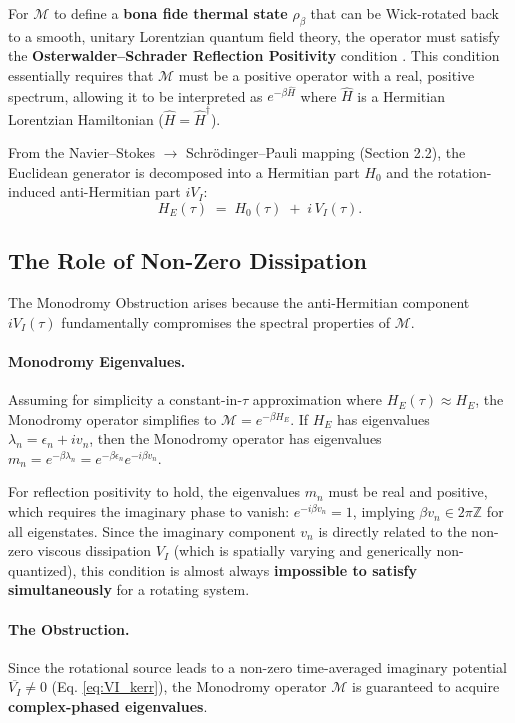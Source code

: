 \documentclass[11pt]{article}
\begin{document}
For $\mathcal{M}$ to define a \textbf{bona fide thermal state} $\rho_\beta$ that can be Wick-rotated back to a smooth, unitary Lorentzian quantum field theory, the operator must satisfy the \textbf{Osterwalder--Schrader Reflection Positivity\cite{OsterwalderSchrader1973}} condition \cite{OsterwalderSchrader1973}. This condition essentially requires that $\mathcal{M}$ must be a positive operator with a real, positive spectrum, allowing it to be interpreted as $e^{-\beta \widehat{H}}$ where $\widehat{H}$ is a Hermitian Lorentzian Hamiltonian ($\widehat{H} = \widehat{H}^\dagger$).

From the Navier--Stokes $\to$ Schrödinger--Pauli mapping (Section 2.2), the Euclidean generator is decomposed into a Hermitian part $H_0$ and the rotation-induced anti-Hermitian part $iV_I$:
\begin{equation}\label{eq:HE_decomp}
    H_E(\tau) \;=\; H_0(\tau) \;+\; i\,V_I(\tau).
\end{equation}

\subsection{The Role of Non-Zero Dissipation}

The Monodromy Obstruction arises because the anti-Hermitian component $iV_I(\tau)$ fundamentally compromises the spectral properties of $\mathcal{M}$.

\paragraph{Monodromy Eigenvalues.}
Assuming for simplicity a constant-in-$\tau$ approximation where $H_E(\tau) \approx H_E$, the Monodromy operator simplifies to $\mathcal{M} = e^{-\beta H_E}$. If $H_E$ has eigenvalues $\lambda_n = \epsilon_n + i v_n$, then the Monodromy operator has eigenvalues $m_n = e^{-\beta \lambda_n} = e^{-\beta \epsilon_n} e^{-i \beta v_n}$.

For reflection positivity to hold, the eigenvalues $m_n$ must be real and positive, which requires the imaginary phase to vanish: $e^{-i\beta v_n}=1$, implying $\beta v_n \in 2\pi\mathbb Z$ for all eigenstates. Since the imaginary component $v_n$ is directly related to the non-zero viscous dissipation $V_I$ (which is spatially varying and generically non-quantized), this condition is almost always \textbf{impossible to satisfy simultaneously} for a rotating system.

\paragraph{The Obstruction.}
Since the rotational source leads to a non-zero time-averaged imaginary potential $\overline{V_I} \neq 0$ (Eq. \ref{eq:VI_kerr}), the Monodromy operator $\mathcal{M}$ is guaranteed to acquire \textbf{complex-phased eigenvalues}.
\end{document}
